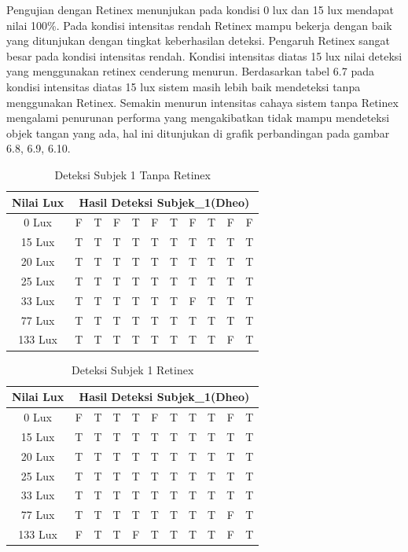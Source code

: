 Pengujian dengan Retinex menunjukan pada kondisi 0 lux dan 15 lux mendapat nilai 100\%. Pada kondisi intensitas rendah Retinex mampu bekerja dengan baik yang ditunjukan dengan tingkat keberhasilan deteksi. Pengaruh Retinex sangat besar pada kondisi intensitas rendah. Kondisi intensitas diatas 15 lux nilai deteksi yang menggunakan retinex cenderung menurun. Berdasarkan tabel 6.7 pada kondisi intensitas diatas 15 lux sistem masih lebih baik mendeteksi tanpa menggunakan Retinex. Semakin menurun intensitas cahaya sistem tanpa Retinex mengalami penurunan performa yang mengakibatkan tidak mampu mendeteksi objek tangan yang ada, hal ini ditunjukan di grafik perbandingan pada gambar 6.8, 6.9, 6.10.
\begin{table}[H]
	\centering
	\caption{Deteksi Subjek 1 Tanpa Retinex}
	\begin{tabular}{|c|c|c|c|c|c|c|c|c|c|c|}
		\hline Nilai Lux
		& \multicolumn{10}{|c|}{Hasil Deteksi Subjek\_1(Dheo)} \\
		\hline 0 Lux &F &T &F &T &F &T &F &T &F &F\\
		\hline 15 Lux &T &T &T & T&T &T &T &T &T &T\\
		\hline 20 Lux &T &T &T & T&T &T &T &T &T &T\\
		\hline 25 Lux &T &T &T & T&T &T &T &T &T &T\\
		\hline 33 Lux &T &T &T & T&T &T &F &T &T &T\\
		\hline 77 Lux &T &T &T &T &T &T &T &T &T &T\\
		\hline 133 Lux &T &T &T &T &T &T &T &T &F &T\\
		\hline
	\end{tabular}
\end{table}
\begin{table}[H]
	\centering
	\caption{Deteksi Subjek 1 Retinex}
	\begin{tabular}{|c|c|c|c|c|c|c|c|c|c|c|}
		\hline Nilai Lux
		& \multicolumn{10}{|c|}{Hasil Deteksi Subjek\_1(Dheo)} \\
		\hline 0 Lux &F &T &T &T &F &T &T &T &F &T\\
		\hline 15 Lux &T &T &T & T &T &T &T &T &T &T\\
		\hline 20 Lux &T &T &T &T &T &T &T &T &T &T\\
		\hline 25 Lux &T &T &T &T &T &T &T &T &T &T\\
		\hline 33 Lux &T &T &T &T &T &T &T &T &T &T\\
		\hline 77 Lux &T &T &T &T &T &T &T &T &F &T\\
		\hline 133 Lux &F &T &T &F &T &T &T &T &F &T \\
		\hline
	\end{tabular}
\end{table}
